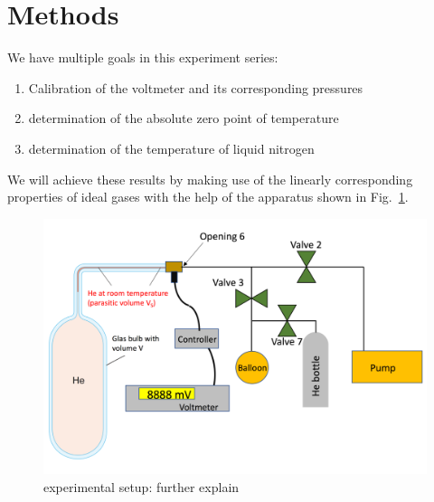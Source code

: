 \section{Methods}


    We have multiple goals in this experiment series:
    \begin{enumerate}
        \item Calibration of the voltmeter and its corresponding pressures
        \item determination of the absolute zero point of temperature
        \item determination of the temperature of liquid nitrogen
    \end{enumerate}
    We will achieve these results by making use of the linearly corresponding properties of ideal gases with the help of the apparatus shown in Fig.~\ref{fig_setup}.

    \begin{figure}[H]
        \centering
        \includegraphics[]{src/images/experimental_setup.png}
        \caption{experimental setup: further explain}
        \label{fig_setup}
    \end{figure}

